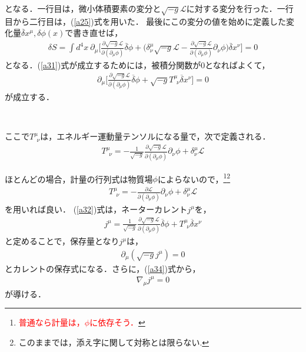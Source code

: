 となる．一行目は，微小体積要素の変分と$\sqrt{-g}\mathcal{L}$に対する変分を行った．一行目から二行目は，(\ref{a25})式を用いた．
最後にこの変分の値を始めに定義した変化量$\overline{\delta}x^{\mu},\delta\phi(x)$で書き直せば，
\begin{eqnarray}
\label{a31}
\delta S=\int d^4x \  \partial_{\mu} \biggl[\frac{\partial \sqrt{-g}\mathcal{L}}{\partial(\partial_{\mu} \phi)}\overline{\delta}\phi+\biggl(\delta^{\mu}_{\nu}\sqrt{-g}\mathcal{L}-\frac{\partial \sqrt{-g}\mathcal{L}}{\partial(\partial_{\mu} \phi)}\partial_{\nu}\phi\biggr)\overline{\delta}x^{\nu}\biggr]=0
\end{eqnarray}
となる．(\ref{a31})式が成立するためには，被積分関数が$0$となればよくて，
\begin{eqnarray}
\label{a32}
\partial_{\mu} \biggl[\frac{\partial \sqrt{-g}\mathcal{L}}{\partial(\partial_{\mu} \phi)}\overline{\delta}\phi+\sqrt{-g}T^{\mu}_{\ \  \nu}\overline{\delta}x^{\nu}\biggr]=0
\end{eqnarray}
が成立する．
\begin{empheqboxed}
\

ここで$T^{\mu}_{\ \ \nu}$は，エネルギー運動量テンソルになる量で，次で定義される．
\begin{eqnarray}
\label{emt1}
T_{\ \ \nu}^\mu=-\frac{1}{\sqrt{-g}}\frac{\partial \sqrt{-g}\mathcal{L}}{\partial(\partial_{\mu} \phi)}\partial_{\nu}\phi+\delta^{\mu}_{\nu}\mathcal{L}
\end{eqnarray}

\end{empheqboxed}
ほとんどの場合，計量の行列式は物質場$\phi$によらないので，\footnote{\textcolor{red}{普通なら計量は，$\phi$に依存そう．}}\footnote{このままでは，添え字に関して対称とは限らない.}
\begin{eqnarray}
T_{\ \ \nu}^\mu=-\frac{\partial \mathcal{L}}{\partial(\partial_{\mu} \phi)}\partial_{\nu}\phi+\delta^{\mu}_{\nu}\mathcal{L}
\end{eqnarray}
を用いれば良い．
(\ref{a32})式は，ネーターカレント$j^{\mu}$を，
\begin{eqnarray}
j^{\mu}=\frac{1}{\sqrt{-g}}\frac{\partial \sqrt{-g}\mathcal{L}}{\partial(\partial_{\mu} \phi)}\overline{\delta}\phi+T^{\mu}_{\ \  \nu}\overline{\delta}x^{\nu}
\end{eqnarray}
と定めることで，保存量となり$j^{\mu}$は，
\begin{eqnarray}
\partial_{\mu}(\sqrt{-g}j^{\mu})=0
\end{eqnarray}
とカレントの保存式になる．さらに，(\ref{a34})式から，
\begin{eqnarray}
\label{ncu}
\nabla_{\mu}j^{\mu}=0
\end{eqnarray}
が導ける．
